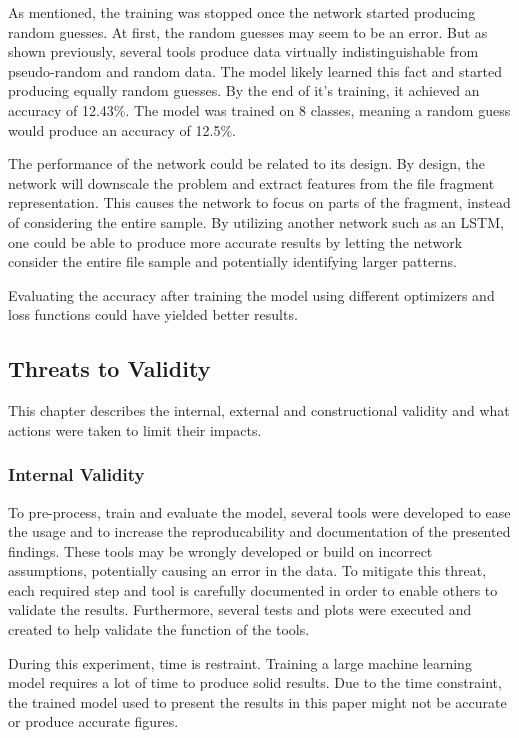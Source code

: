 \documentclass[conference]{IEEEtran}
\begin{document}
As mentioned, the training was stopped once the network started producing random guesses. At first, the random guesses may seem to be an error. But as shown previously, several tools produce data virtually indistinguishable from pseudo-random and random data. The model likely learned this fact and started producing equally random guesses. By the end of it's training, it achieved an accuracy of 12.43\%. The model was trained on 8 classes, meaning a random guess would produce an accuracy of 12.5\%.

The performance of the network could be related to its design. By design, the network will downscale the problem and extract features from the file fragment representation\cite{chen2018}. This causes the network to focus on parts of the fragment, instead of considering the entire sample. By utilizing another network such as an LSTM, one could be able to produce more accurate results by letting the network consider the entire file sample and potentially identifying larger patterns\cite{LE2018S118}.

Evaluating the accuracy after training the model using different optimizers and loss functions could have yielded better results.

\subsection{Threats to Validity}
This chapter describes the internal, external and constructional validity and what actions were taken to limit their impacts.

\subsubsection{Internal Validity}
To pre-process, train and evaluate the model, several tools were developed to ease the usage and to increase the reproducability and documentation of the presented findings. These tools may be wrongly developed or build on incorrect assumptions, potentially causing an error in the data. To mitigate this threat, each required step and tool is carefully documented in order to enable others to validate the results. Furthermore, several tests and plots were executed and created to help validate the function of the tools.

During this experiment, time is restraint. Training a large machine learning model requires a lot of time to produce solid results. Due to the time constraint, the trained model used to present the results in this paper might not be accurate or produce accurate figures.
\end{document}
